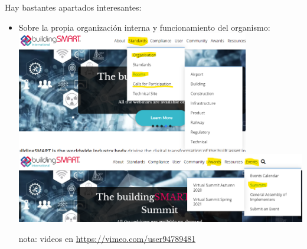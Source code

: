 \documentclass[spanish,10pt,a4paper,final,oneside]{article}
\begin{document}
\vspace{0.5cm}
Hay bastantes apartados interesantes:
\begin{itemize}

\item Sobre la propia organización interna y funcionamiento del organismo:
\\ \includegraphics[width=0.8\textwidth]{web - Estandards - Organization - Rooms}
\\ \includegraphics[width=\textwidth]{web - Events- Summits}
\begin{flushright}nota: videos en \url{https://vimeo.com/user94789481}\end{flushright}


\end{itemize}
\end{document}
